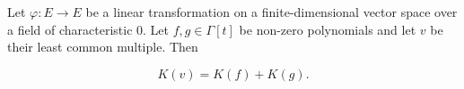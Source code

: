Let $\varphi: E \to E$ be a linear transformation on a finite-dimensional vector space over a field of characteristic $0$. Let $f, g \in \Gamma[t]$ be non-zero polynomials and let $v$ be their least common multiple. Then

$$K(v) = K(f) + K(g).$$
